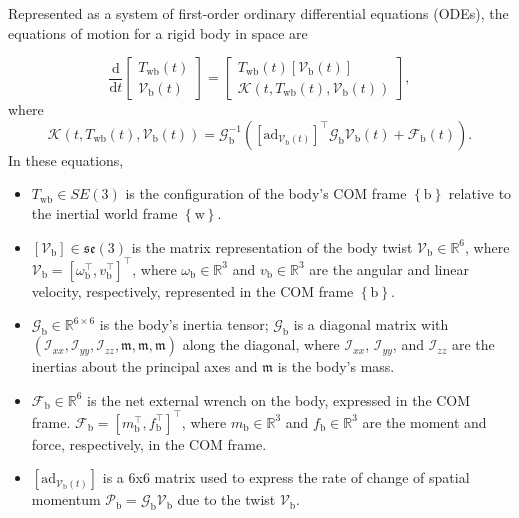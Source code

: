 \documentclass[]{article}
\theoremstyle{definition}
\theoremstyle{remark}
\begin{document}
Represented as a system of first-order ordinary differential equations (ODEs), the equations of motion for a rigid body in space are

\begin{equation}
\frac{\mathrm{d}}{\mathrm{d}t}
\begin{bmatrix}
T_\mathrm{wb}(t)\\
\mathcal{V}_\mathrm{b}(t)
\end{bmatrix}
=
\begin{bmatrix}
T_\mathrm{wb}(t)\left[\mathcal{V}_\mathrm{b}(t)\right]\\
\mathcal{K}\left(t,T_\mathrm{wb}(t),\mathcal{V}_\mathrm{b}(t)\right)
\end{bmatrix},
\end{equation}
where
\begin{equation}
\mathcal{K}\left(t,T_\mathrm{wb}(t),\mathcal{V}_\mathrm{b}(t)\right) = \mathcal{G}_\mathrm{b}^{-1}\left(\left[\mathrm{ad}_{\mathcal{V}_\mathrm{b}(t)}\right]^{\top}\mathcal{G}_\mathrm{b}\mathcal{V}_\mathrm{b}(t) + \mathcal{F}_\mathrm{b}(t)\right).
\end{equation}
In these equations,
\begin{itemize}
	\item $T_\mathrm{wb}\in SE(3)$ is the configuration of the body's COM frame $\left\{\mathrm{b}\right\}$ relative to the inertial world frame $\left\{\mathrm{w}\right\}$.
	\item $\left[\mathcal{V}_\mathrm{b}\right]\in\mathfrak{se}(3)$ is the matrix representation of the body twist $\mathcal{V}_\mathrm{b}\in\mathbb{R}^6$, where $\mathcal{V}_\mathrm{b} = \left[\omega_\mathrm{b}^{\top},v_\mathrm{b}^{\top}\right]^{\top}$, where $\omega_\mathrm{b}\in\mathbb{R}^3$ and $v_\mathrm{b}\in\mathbb{R}^3$ are the angular and linear velocity, respectively, represented in the COM frame $\left\{\mathrm{b}\right\}$.
	\item $\mathcal{G}_\mathrm{b}\in\mathbb{R}^{6\times6}$ is the body's inertia tensor; $\mathcal{G}_\mathrm{b}$ is a diagonal matrix with $\left(\mathcal{I}_{xx},\mathcal{I}_{yy},\mathcal{I}_{zz},\mathfrak{m},\mathfrak{m},\mathfrak{m}\right)$ along the diagonal, where $\mathcal{I}_{xx}$, $\mathcal{I}_{yy}$, and $\mathcal{I}_{zz}$ are the inertias about the principal axes and $\mathfrak{m}$ is the body's mass.
	\item $\mathcal{F}_\mathrm{b}\in\mathbb{R}^6$ is the net external wrench on the body, expressed in the COM frame. $\mathcal{F}_\mathrm{b} = \left[m_\mathrm{b}^{\top},f_\mathrm{b}^{\top}\right]^{\top}$, where $m_\mathrm{b}\in\mathbb{R}^3$ and $f_\mathrm{b}\in\mathbb{R}^3$ are the moment and force, respectively, in the COM frame.
	\item $\left[\mathrm{ad}_{\mathcal{V}_\mathrm{b}(t)}\right]$ is a 6x6 matrix used to express the rate of change of spatial momentum $\mathcal{P}_\mathrm{b} = \mathcal{G}_\mathrm{b}\mathcal{V}_\mathrm{b}$ due to the twist $\mathcal{V}_\mathrm{b}$.
\end{itemize}
\end{document}
